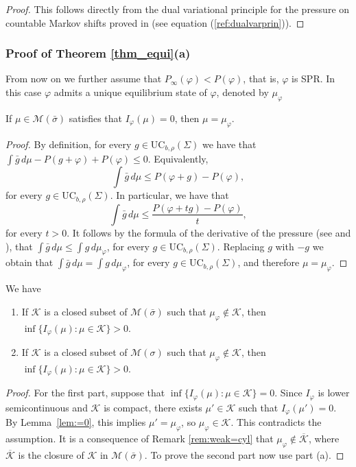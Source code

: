 \documentclass[letterpaper,11pt]{amsart}
\numberwithin{equation}{section}     %
\newcommand{\M}{\mathcal{M}}
\def\phi{\varphi}
\def\M{{\mathcal M}}
\def\le{\leqslant}
\def\M{\mathcal{M}}
\begin{document}
\begin{proof}
    This follows directly from the dual variational principle for the pressure on countable Markov shifts proved in \cite{iv2} (see equation (\ref{ref:dualvarprin})). 
\end{proof}

\subsubsection{Proof of Theorem \ref{thm_equi}(a)}
From now on we further assume that $P_\infty(\phi)<P(\phi)$, that is, $\phi$ is SPR. In this case  $\phi$ admits a unique equilibrium state of $\phi$, denoted by $\mu_\phi$  

\begin{lemma}\label{lem:=0} If $\mu\in\M(\bar\sigma)$ satisfies that $I_\phi(\mu)=0$, then $\mu=\mu_\phi$.
\end{lemma}

\begin{proof} By definition,   for every $g\in  \text{UC}_{b,\rho}(\Sigma)$ we have that  $\int \bar{g} \,d\mu-P(g+\phi)+P(\phi)\le 0$.  Equivalently, 
$$\int \bar{g} \, d\mu\le P(\phi+g)-P(\phi),$$
for every $g\in  \text{UC}_{b,\rho}(\Sigma)$. In particular, we have that 
$$\int \bar{g} \, d\mu\le \frac{P(\phi+tg)-P(\phi)}{t},$$
for every $t>0$. It follows by the formula of the derivative of the pressure (see \cite[Theorem 3.2]{sr} and \cite{ijv}), that $\int \bar{g} \, d\mu\le \int g \, d \mu_\phi$, for every $g\in\text{UC}_{b,\rho}(\Sigma)$. Replacing $g$ with $-g$ we obtain that  $\int \bar{g} \, d\mu= \int g \, d \mu_\phi$, for every $g\in\text{UC}_{b,\rho}(\Sigma)$, and therefore $\mu=\mu_\phi$. 
\end{proof}

\begin{corollary} \label{cor:obs} We have
\begin{enumerate}
\item If $\mathcal{K}$ is a closed subset of $\M(\bar\sigma)$ such that $\mu_\phi\notin \mathcal{K}$, then 
$\inf\{I_\phi(\mu):\mu\in \mathcal{K}\}>0.$ 
\item If $\mathcal{K}$ is a closed subset of $\M(\sigma)$ such that $\mu_\phi\notin \mathcal{K}$, then 
$\inf\{I_\phi(\mu):\mu\in \mathcal{K}\}>0.$
\end{enumerate}
\end{corollary}
\begin{proof}
For the first part, suppose that $\inf\{I_\phi(\mu):\mu\in \mathcal{K}\}=0$. Since $I_\phi$ is lower semicontinuous and $\mathcal{K}$ is compact, there exists $\mu' \in \mathcal{K}$ such that $I_\phi(\mu')=0$. By Lemma~\ref{lem:=0}, this implies $\mu'=\mu_{\phi}$, so $\mu_\phi\in \mathcal{K}$. This contradicts the assumption. 
It is a consequence of Remark \ref{rem:weak=cyl} that $\mu_\phi\notin\overline{\mathcal{K}}$, where $\overline{\mathcal{K}}$ is the closure of ${\mathcal{K}}$ in $\M(\bar\sigma)$. To prove the second part  now  use part (a).
\end{proof}
\end{document}
